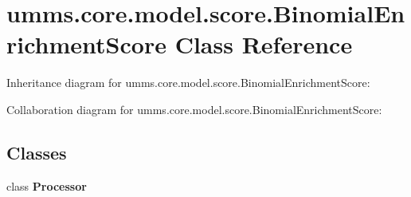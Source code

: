 \hypertarget{classumms_1_1core_1_1model_1_1score_1_1_binomial_enrichment_score}{\section{umms.\+core.\+model.\+score.\+Binomial\+Enrichment\+Score Class Reference}
\label{classumms_1_1core_1_1model_1_1score_1_1_binomial_enrichment_score}
}


Inheritance diagram for umms.\+core.\+model.\+score.\+Binomial\+Enrichment\+Score\+:


Collaboration diagram for umms.\+core.\+model.\+score.\+Binomial\+Enrichment\+Score\+:
\subsection*{Classes}
\begin{DoxyCompactItemize}
\item 
class {\bfseries Processor}
\end{DoxyCompactItemize}
